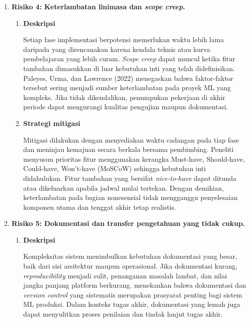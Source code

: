 \begin{enumerate}
    \item \textbf{Risiko 4: Keterlambatan linimasa dan \textit{scope creep}.}
    
    \vspace{0.5em}
    \begin{enumerate}[label=\alph*)]
        \item \textbf{Deskripsi}
        
        Setiap fase implementasi berpotensi memerlukan waktu lebih lama daripada yang direncanakan karena kendala teknis atau kurva pembelajaran yang lebih curam. \textit{Scope creep} dapat muncul ketika fitur tambahan dimasukkan di luar kebutuhan inti yang telah didefinisikan. Paleyes, Urma, dan Lawrence (2022) menegaskan bahwa faktor-faktor tersebut sering menjadi sumber keterlambatan pada proyek ML yang kompleks. Jika tidak dikendalikan, penumpukan pekerjaan di akhir periode dapat mengurangi kualitas pengujian maupun dokumentasi.
        
        \vspace{0.5em}
        
        \item \textbf{Strategi mitigasi}
        
        Mitigasi dilakukan dengan menyediakan waktu cadangan pada tiap fase dan meninjau kemajuan secara berkala bersama pembimbing. Peneliti menyusun prioritas fitur menggunakan kerangka Must-have, Should-have, Could-have, Won't-have (MoSCoW) sehingga kebutuhan inti didahulukan. Fitur tambahan yang bersifat \textit{nice-to-have} dapat ditunda atau dikeluarkan apabila jadwal mulai tertekan. Dengan demikian, keterlambatan pada bagian nonesensial tidak mengganggu penyelesaian komponen utama dan tenggat akhir tetap realistis.
        
        \vspace{0.5em}
    \end{enumerate}
    
    \item \textbf{Risiko 5: Dokumentasi dan transfer pengetahuan yang tidak cukup.}
    
    \vspace{0.5em}
    \begin{enumerate}[label=\alph*)]
        \item \textbf{Deskripsi}
        
        Kompleksitas sistem menimbulkan kebutuhan dokumentasi yang besar, baik dari sisi arsitektur maupun operasional. Jika dokumentasi kurang, \textit{reproducibility} menjadi sulit, penanganan masalah lambat, dan nilai jangka panjang platform berkurang. \textcite{munappy2022data} menekankan bahwa dokumentasi dan \textit{version control} yang sistematis merupakan prasyarat penting bagi sistem ML produksi. Dalam konteks tugas akhir, dokumentasi yang lemah juga dapat menyulitkan proses penilaian dan tindak lanjut tugas akhir.
        

\end{enumerate}
\end{enumerate}
